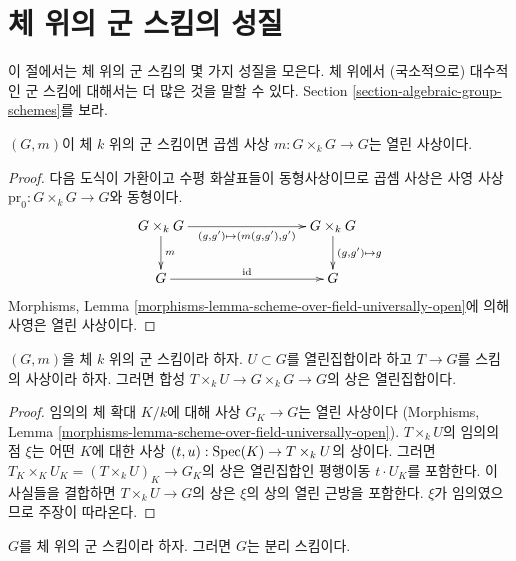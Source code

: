 \section{체 위의 군 스킴의 성질}
\label{section-properties-group-schemes-field}

\noindent
이 절에서는 체 위의 군 스킴의 몇 가지 성질을 모은다. 체 위에서 (국소적으로) 대수적인
군 스킴에 대해서는 더 많은 것을 말할 수 있다. Section \ref{section-algebraic-group-schemes}를 보라.

\begin{lemma}
\label{lemma-group-scheme-over-field-open-multiplication}
$(G, m)$이 체 $k$ 위의 군 스킴이면 곱셈 사상 $m : G \times_k G \to G$는 열린 사상이다.
\end{lemma}

\begin{proof}
다음 도식이 가환이고 수평 화살표들이 동형사상이므로 곱셈 사상은 사영 사상
$\text{pr}_0 : G \times_k G \to G$와 동형이다.
$$
\xymatrix{
G \times_k G \ar[d]^m \ar[rrr]_{(g, g') \mapsto (m(g, g'), g')} & & &
G \times_k G \ar[d]^{(g, g') \mapsto g} \\
G \ar[rrr]^{\text{id}} & & & G
}
$$
Morphisms, Lemma \ref{morphisms-lemma-scheme-over-field-universally-open}에 의해 사영은 열린 사상이다.
\end{proof}

\begin{lemma}
\label{lemma-group-scheme-over-field-translate-open}
$(G, m)$을 체 $k$ 위의 군 스킴이라 하자. $U \subset G$를 열린집합이라 하고
$T \to G$를 스킴의 사상이라 하자. 그러면 합성 $T \times_k U \to G \times_k G \to G$의 상은 열린집합이다.
\end{lemma}

\begin{proof}
임의의 체 확대 $K/k$에 대해 사상 $G_K \to G$는 열린 사상이다
(Morphisms, Lemma \ref{morphisms-lemma-scheme-over-field-universally-open}).
$T \times_k U$의 임의의 점 $\xi$는 어떤 $K$에 대한 사상
$(t, u) : \mathop{\mathrm{Spec}}(K) \to T \times_k U$의 상이다. 그러면
$T_K \times_K U_K = (T \times_k U)_K \to G_K$의 상은 열린집합인 평행이동
$t \cdot U_K$를 포함한다. 이 사실들을 결합하면 $T \times_k U \to G$의 상은 $\xi$의 상의
열린 근방을 포함한다. $\xi$가 임의였으므로 주장이 따라온다.
\end{proof}

\begin{lemma}
\label{lemma-group-scheme-over-field-separated}
$G$를 체 위의 군 스킴이라 하자. 그러면 $G$는 분리 스킴이다.
\end{lemma}

